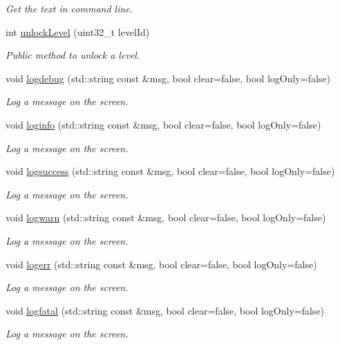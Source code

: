 \begin{DoxyCompactItemize}
\begin{DoxyCompactList}\small\item\em Get the text in command line. \end{DoxyCompactList}\item 
int \hyperlink{class_scene_cheat_code_a98b29422b8c75d86ff960737ae05285b}{unlock\+Level} (uint32\+\_\+t level\+Id)
\begin{DoxyCompactList}\small\item\em Public method to unlock a level. \end{DoxyCompactList}\item 
void \hyperlink{class_scene_cheat_code_a1e333ad7c13d00f08728447e2ef3cd97}{logdebug} (std\+::string const \&msg, bool clear=false, bool log\+Only=false)
\begin{DoxyCompactList}\small\item\em Log a message on the screen. \end{DoxyCompactList}\item 
void \hyperlink{class_scene_cheat_code_a061d29f5282e35d57e31003275603004}{loginfo} (std\+::string const \&msg, bool clear=false, bool log\+Only=false)
\begin{DoxyCompactList}\small\item\em Log a message on the screen. \end{DoxyCompactList}\item 
void \hyperlink{class_scene_cheat_code_ad4fbb17a16c265f97caf20a255d3fb57}{logsuccess} (std\+::string const \&msg, bool clear=false, bool log\+Only=false)
\begin{DoxyCompactList}\small\item\em Log a message on the screen. \end{DoxyCompactList}\item 
void \hyperlink{class_scene_cheat_code_a8fabd10f3ef3389cc660acb5072cd51a}{logwarn} (std\+::string const \&msg, bool clear=false, bool log\+Only=false)
\begin{DoxyCompactList}\small\item\em Log a message on the screen. \end{DoxyCompactList}\item 
void \hyperlink{class_scene_cheat_code_a41cde9a335e54322df5f170502f25be2}{logerr} (std\+::string const \&msg, bool clear=false, bool log\+Only=false)
\begin{DoxyCompactList}\small\item\em Log a message on the screen. \end{DoxyCompactList}\item 
void \hyperlink{class_scene_cheat_code_a391bbb8e4c0d58ba1b2801a6694326f4}{logfatal} (std\+::string const \&msg, bool clear=false, bool log\+Only=false)
\begin{DoxyCompactList}\small\item\em Log a message on the screen. \end{DoxyCompactList}\end{DoxyCompactItemize}
